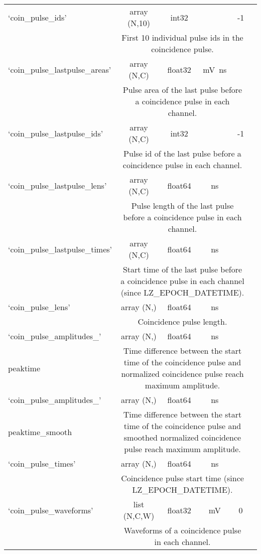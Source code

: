 \begin{center}
\begin{longtable}[!htbp]{|l||*{5}{c|}}
	 	`coin\_pulse\_ids' & array (N,10) & int32 && -1  \\\cline{2-6} & \multicolumn{4}{m{27em}|}{First 10 individual pulse ids in the coincidence pulse.} \\\hline
	 	`coin\_pulse\_lastpulse\_areas' & array (N,C) & float32 &\si{\mV\ns}& \si{\nan} \\\cline{2-6} & \multicolumn{4}{m{27em}|}{Pulse area of the last pulse before a coincidence pulse in each channel.}\\\hline
	 	`coin\_pulse\_lastpulse\_ids' & array (N,C) & int32 && -1 \\\cline{2-6} & \multicolumn{4}{m{27em}|}{Pulse id of the last pulse before a coincidence pulse in each channel.}\\\hline
	 	`coin\_pulse\_lastpulse\_lens' & array (N,C) & float64 &\si{\ns}& \si{\nan} \\\cline{2-6} & \multicolumn{4}{m{27em}|}{Pulse length of the last pulse before a coincidence pulse in each channel.}\\\hline
	 	`coin\_pulse\_lastpulse\_times' & array (N,C) & float64 &\si{\ns}& \si{\nan} \\\cline{2-6} & \multicolumn{4}{m{27em}|}{Start time of the last pulse before a coincidence pulse in each channel (since LZ\_EPOCH\_DATETIME).}\\\hline
	 	`coin\_pulse\_lens'& array (N,) & float64 &\si{\ns}& \si{\nan} \\\cline{2-6} & \multicolumn{4}{m{27em}|}{Coincidence pulse length.}\\\hline
	 	`coin\_pulse\_amplitudes\_'& array (N,) & float64 &\si{\ns}& \si{\nan} \\\cline{2-6} peaktime & \multicolumn{4}{m{27em}|}{Time difference between the start time of the coincidence pulse and normalized coincidence pulse reach maximum amplitude.}\\\hline
	 	`coin\_pulse\_amplitudes\_'& array (N,) & float64 &\si{\ns}& \si{\nan} \\\cline{2-6} peaktime\_smooth & \multicolumn{4}{m{27em}|}{Time difference between the start time of the coincidence pulse and smoothed normalized coincidence pulse reach maximum amplitude.}\\\hline
	 	`coin\_pulse\_times'& array (N,) & float64 &\si{\ns}& \si{\nan} \\\cline{2-6} & \multicolumn{4}{m{27em}|}{Coincidence pulse start time (since LZ\_EPOCH\_DATETIME).}\\\hline
	 	`coin\_pulse\_waveforms' & list (N,C,W) & float32 & \si{\mV} & 0 \\\cline{2-6} & \multicolumn{4}{m{27em}|}{Waveforms of a coincidence pulse in each channel.}\\\hline

\end{longtable}
\end{center}
